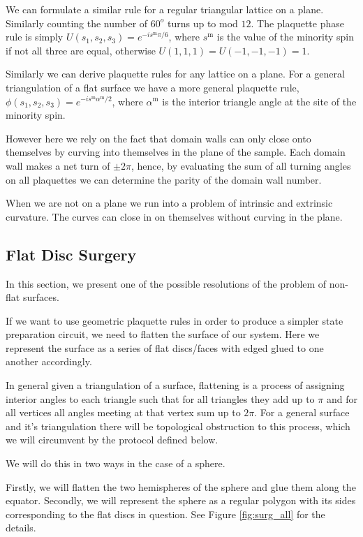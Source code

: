 \documentclass[a4paper,twocolumn,11pt]{quantumarticle}
\begin{document}
We can formulate a similar rule for a regular triangular lattice on a plane. Similarly counting the number of $60^o$ turns up to mod $12$. The plaquette phase rule is simply $U(s_1, s_2, s_3) = e^{-i s^\text{m} \pi/6}$, where $s^\text{m}$ is the value of the minority spin if not all three are equal, otherwise $U(1, 1, 1) = U(-1, -1, -1) = 1$.

Similarly we can derive plaquette rules for any lattice on a plane.
For a general triangulation of a flat surface we have a more general plaquette rule, $\phi(s_1, s_2, s_3) = e^{-i s^\text{m} \alpha^\text{m}/2}$, where $\alpha^\text{m}$ is the interior triangle angle at the site of the minority spin.

However here we rely on the fact that domain walls can only close onto themselves by curving into themselves in the plane of the sample. Each domain wall makes a net turn of $\pm 2\pi$, hence, by evaluating the sum of all turning angles on all plaquettes we can determine the parity of the domain wall number. 

When we are not on a plane we run into a problem of intrinsic and extrinsic curvature. The curves can close in on themselves without curving in the plane.

\subsection{Flat Disc Surgery}

In this section, we present one of the possible resolutions of the problem of non-flat surfaces.

If we want to use geometric plaquette rules in order to produce a simpler state preparation circuit, we need to flatten the surface of our system. Here we represent the surface as a series of flat discs/faces with edged glued to one another accordingly.

In general given a triangulation of a surface, flattening is a process of assigning interior angles to each triangle such that for all triangles they add up to $\pi$ and for all vertices all angles meeting at that vertex sum up to $2\pi$. For a general surface and it's triangulation there will be topological obstruction to this process, which we will circumvent by the protocol defined below.

We will do this in two ways in the case of a sphere.

Firstly, we will flatten the two hemispheres of the sphere and glue them along the equator. Secondly, we will represent the sphere as a regular polygon with its sides corresponding to the flat discs in question. See Figure \ref{fig:surg_all} for the details.
\end{document}
